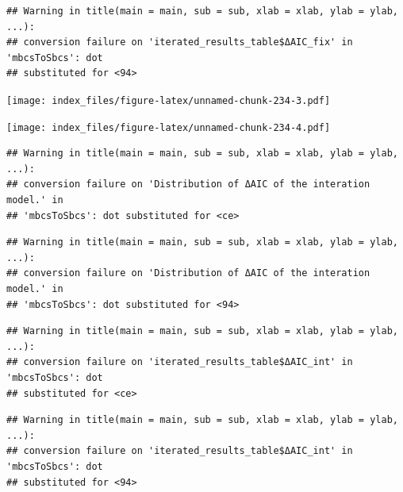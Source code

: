 \documentclass[
]{article}
\newenvironment{Shaded}{\begin{snugshade}}{\end{snugshade}}
\newcommand{\AttributeTok}[1]{\textcolor[rgb]{0.77,0.63,0.00}{#1}}
\newcommand{\FunctionTok}[1]{\textcolor[rgb]{0.00,0.00,0.00}{#1}}
\newcommand{\NormalTok}[1]{#1}
\newcommand{\SpecialCharTok}[1]{\textcolor[rgb]{0.00,0.00,0.00}{#1}}
\newcommand{\StringTok}[1]{\textcolor[rgb]{0.31,0.60,0.02}{#1}}
\begin{document}
\begin{verbatim}
## Warning in title(main = main, sub = sub, xlab = xlab, ylab = ylab, ...):
## conversion failure on 'iterated_results_table$ΔAIC_fix' in 'mbcsToSbcs': dot
## substituted for <94>
\end{verbatim}

\texttt{[image: index\_files/figure-latex/unnamed-chunk-234-3.pdf]}

\begin{Shaded}
\end{Shaded}

\texttt{[image: index\_files/figure-latex/unnamed-chunk-234-4.pdf]}

\begin{Shaded}
\end{Shaded}

\begin{verbatim}
## Warning in title(main = main, sub = sub, xlab = xlab, ylab = ylab, ...):
## conversion failure on 'Distribution of ΔAIC of the interation model.' in
## 'mbcsToSbcs': dot substituted for <ce>
\end{verbatim}

\begin{verbatim}
## Warning in title(main = main, sub = sub, xlab = xlab, ylab = ylab, ...):
## conversion failure on 'Distribution of ΔAIC of the interation model.' in
## 'mbcsToSbcs': dot substituted for <94>
\end{verbatim}

\begin{verbatim}
## Warning in title(main = main, sub = sub, xlab = xlab, ylab = ylab, ...):
## conversion failure on 'iterated_results_table$ΔAIC_int' in 'mbcsToSbcs': dot
## substituted for <ce>
\end{verbatim}

\begin{verbatim}
## Warning in title(main = main, sub = sub, xlab = xlab, ylab = ylab, ...):
## conversion failure on 'iterated_results_table$ΔAIC_int' in 'mbcsToSbcs': dot
## substituted for <94>
\end{verbatim}
\end{document}
